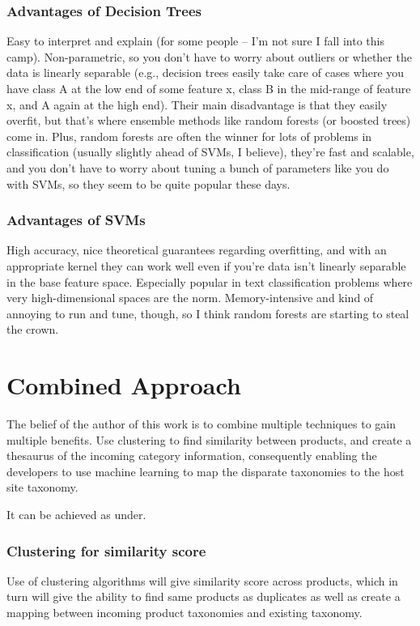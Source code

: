 \documentclass[12pt]{book}
\begin{document}
\subsubsection{Advantages of Decision Trees} Easy to interpret and explain (for some people -- I'm not sure I fall into this camp). Non-parametric, so you don't have to worry about outliers or whether the data is linearly separable (e.g., decision trees easily take care of cases where you have class A at the low end of some feature x, class B in the mid-range of feature x, and A again at the high end). Their main disadvantage is that they easily overfit, but that's where ensemble methods like random forests (or boosted trees) come in. Plus, random forests are often the winner for lots of problems in classification (usually slightly ahead of SVMs, I believe), they're fast and scalable, and you don't have to worry about tuning a bunch of parameters like you do with SVMs, so they seem to be quite popular these days.

\subsubsection{Advantages of SVMs} High accuracy, nice theoretical guarantees regarding overfitting, and with an appropriate kernel they can work well even if you're data isn't linearly separable in the base feature space. Especially popular in text classification problems where very high-dimensional spaces are the norm. Memory-intensive and kind of annoying to run and tune, though, so I think random forests are starting to steal the crown.

\section{Combined Approach}
The belief of the author of this work is to combine multiple techniques to gain multiple benefits. Use clustering to find similarity between products, and create a thesaurus of the incoming category information, consequently enabling the developers to use machine learning to map the disparate taxonomies to the host site taxonomy.

It can be achieved as under.
\subsubsection{Clustering for similarity score}
Use of clustering algorithms will give similarity score across products, which in turn will give the ability to find same products as duplicates as well as create a mapping between incoming product taxonomies and existing taxonomy.
\end{document}

